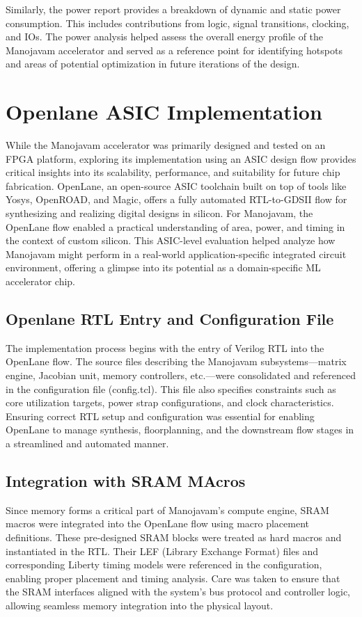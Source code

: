 Similarly, the power report provides a breakdown of dynamic and static power consumption. This includes contributions from logic, signal transitions, clocking, and IOs. The power analysis helped assess the overall energy profile of the Manojavam accelerator and served as a reference point for identifying hotspots and areas of potential optimization in future iterations of the design.

\section{Openlane ASIC Implementation}
While the Manojavam accelerator was primarily designed and tested on an FPGA platform, exploring its implementation using an ASIC design flow provides critical insights into its scalability, performance, and suitability for future chip fabrication. OpenLane, an open-source ASIC toolchain built on top of tools like Yosys, OpenROAD, and Magic, offers a fully automated RTL-to-GDSII flow for synthesizing and realizing digital designs in silicon. For Manojavam, the OpenLane flow enabled a practical understanding of area, power, and timing in the context of custom silicon. This ASIC-level evaluation helped analyze how Manojavam might perform in a real-world application-specific integrated circuit environment, offering a glimpse into its potential as a domain-specific ML accelerator chip.

\subsection{Openlane RTL Entry and Configuration File}
The implementation process begins with the entry of Verilog RTL into the OpenLane flow. The source files describing the Manojavam subsystems—matrix engine, Jacobian unit, memory controllers, etc.—were consolidated and referenced in the configuration file (config.tcl). This file also specifies constraints such as core utilization targets, power strap configurations, and clock characteristics. Ensuring correct RTL setup and configuration was essential for enabling OpenLane to manage synthesis, floorplanning, and the downstream flow stages in a streamlined and automated manner.

\subsection{Integration with SRAM MAcros}
Since memory forms a critical part of Manojavam's compute engine, SRAM macros were integrated into the OpenLane flow using macro placement definitions. These pre-designed SRAM blocks were treated as hard macros and instantiated in the RTL. Their LEF (Library Exchange Format) files and corresponding Liberty timing models were referenced in the configuration, enabling proper placement and timing analysis. Care was taken to ensure that the SRAM interfaces aligned with the system’s bus protocol and controller logic, allowing seamless memory integration into the physical layout.

